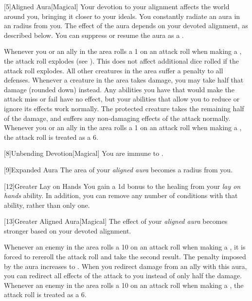             [5]{Aligned Aura}[Magical]
            Your devotion to your alignment affects the world around you, bringing it closer to your ideals.
            You constantly radiate an aura in an \areamed radius  from you.
            The effect of the aura depends on your devoted alignment, as described below.
            You can suppress or resume the aura as a .

             Whenever you or an ally in the area rolls a 1 on an attack roll when making a , the attack roll explodes (see ).
            This does not affect additional dice rolled if the attack roll explodes.
             All other creatures in the area suffer a  penalty to all defenses.
             Whenever a creature in the area takes damage, you may take half that damage (rounded down) instead.
            Any abilities you have that would make the attack miss or fail have no effect, but your abilities that allow you to reduce or ignore its effects work normally.
            The protected creature takes the remaining half of the damage, and suffers any non-damaging effects of the attack normally.
             Whenever you or an ally in the area rolls a 1 on an attack roll when making a , the attack roll is treated as a 6.

            [8]{Unbending Devotion}[Magical]
            You are immune to  .

            [9]{Expanded Aura}
            The area of your \textit{aligned aura} becomes a \arealarge radius  from you.

            [12]{Greater Lay on Hands} 
            You gain a \plus1d bonus to the healing from your \textit{lay on hands} ability.
            In addition, you can remove any number of conditions with that ability, rather than only one.

            [13]{Greater Aligned Aura}[Magical]
            The effect of your \textit{aligned aura} becomes stronger based on your devoted alignment.

             Whenever an enemy in the area rolls a 10 on an attack roll when making a , it is forced to rereroll the attack roll and take the second result.
             The penalty imposed by the aura increases to .
             When you redirect damage from an ally with this aura, you can redirect all effects of the attack to you instead of only half the damage.
             Whenever an enemy in the area rolls a 10 on an attack roll when making a , the attack roll is treated as a 6.

